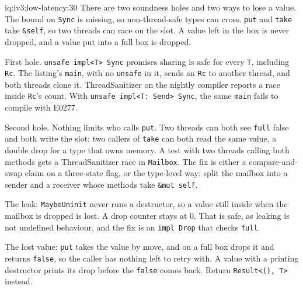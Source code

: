 \begin{solution}{iq:iv3:low-latency:30}
There are two soundness holes and two ways to lose a value. The bound on \texttt{Sync} is missing, so non-thread-safe types can cross. \texttt{put} and \texttt{take} take \texttt{\&self}, so two threads can race on the slot. A value left in the box is never dropped, and a value put into a full box is dropped.

First hole. \texttt{unsafe impl<T> Sync} promises sharing is safe for every \texttt{T}, including \texttt{Rc}. The listing's \texttt{main}, with no \texttt{unsafe} in it, sends an \texttt{Rc} to another thread, and both threads clone it. ThreadSanitizer on the nightly compiler reports a race inside \texttt{Rc}'s count. With \texttt{unsafe impl<T: Send> Sync}, the same \texttt{main} fails to compile with E0277.

Second hole. Nothing limits who calls \texttt{put}. Two threads can both see \texttt{full} false and both write the slot; two callers of \texttt{take} can both read the same value, a double drop for a type that owns memory. A test with two threads calling both methods gets a ThreadSanitizer race in \texttt{Mailbox}. The fix is either a compare-and-swap claim on a three-state flag, or the type-level way: split the mailbox into a sender and a receiver whose methods take \texttt{\&mut self}.

The leak: \texttt{MaybeUninit} never runs a destructor, so a value still inside when the mailbox is dropped is lost. A drop counter stays at 0. That is safe, as leaking is not undefined behaviour, and the fix is an \texttt{impl Drop} that checks \texttt{full}.

The lost value: \texttt{put} takes the value by move, and on a full box drops it and returns \texttt{false}, so the caller has nothing left to retry with. A value with a printing destructor prints its drop before the \texttt{false} comes back. Return \texttt{Result<(), T>} instead.

\end{solution}

